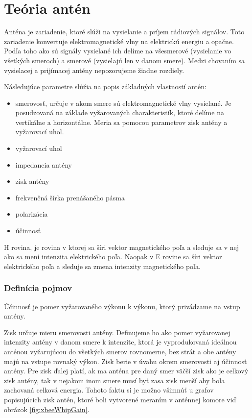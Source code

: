 \documentclass[11pt,twoside,a4paper]{book}
\begin{document}
\chapter{Teória antén}
Anténa je zariadenie, ktoré slúži na vysielanie a príjem rádiových signálov. Toto zariadenie konvertuje elektromagnetické vlny na elektrickú energiu a opačne. Podľa toho ako sú signály vysielané ich delíme na všesmerové (vysielanie vo všetkých smeroch) a smerové (vysielajú len v danom smere). Medzi chovaním sa vysielacej a prijímacej antény nepozorujeme žiadne rozdiely.

Následujúce parametre slúžia na popis základných vlastností antén:
\begin{itemize}
 \item smerovosť, určuje v akom smere sú elektromagnetické vlny vysielané. Je posudzovaná na základe vyžarovaných charakteristík, ktoré delíme na vertikálne a horizontálne. Meria sa pomocou parametrov zisk antény a vyžarovací uhol.
 \item vyžarovací uhol
 \item impedancia antény 
 \item zisk antény
 \item frekvenčná šírka prenášaného pásma
 \item polarizácia
 \item účinnosť
\end{itemize}

H rovina, je rovina v ktorej sa šíri vektor magnetického poľa a sleduje sa v nej ako sa mení intenzita elektrického poľa. Naopak v E rovine sa šíri vektor elektrického poľa a sleduje sa zmena intenzity magnetického poľa.

\subsection{Definícia pojmov}
Účinnosť je pomer vyžarovaného výkonu k výkonu, ktorý privádzame na vstup antény.
\linebreak 

\noindent Zisk určuje mieru smerovosti antény. Definujeme ho ako pomer vyžarovanej intenzity antény v danom smere k intenzite, ktorá je vyprodukovaná ideálnou anténou vyžarujúcou do všetkých smerov rovnomerne, bez strát a obe antény majú na vstupe rovnaký výkon. Zisk berie v úvahu okrem smerovosti aj účinnosť antény. Pre zisk ďalej platí, ak ma anténa pre daný smer väčší zisk ako je celkový zisk antény, tak v nejakom inom smere musí byť zasa zisk menší aby bola zachovaná celková energia. Tohoto faktu si je možno všimnúť u grafov popisujúcich zisk antén, ktoré boli vytvorené meraním v anténnej komore viď obrázok \ref{fig:xbeeWhipGain}.
\end{document}
